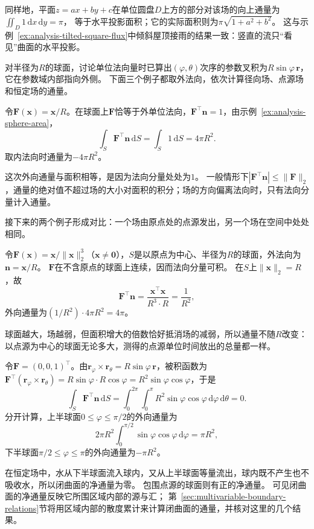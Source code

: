 同样地，平面$z=ax+by+c$在单位圆盘$D$上方的部分对该场的向上通量为$\iint_D1\,\mathrm dx\,\mathrm dy=\pi$，
等于水平投影面积；它的实际面积则为$\pi\sqrt{1+a^2+b^2}$。
这与示例~\ref{ex:analysis-tilted-square-flux}中倾斜屋顶接雨的结果一致：竖直的流只“看见”曲面的水平投影。

对半径为$R$的球面，讨论单位法向量时已算出$(\varphi,\theta)$次序的参数叉积为$R\sin\varphi\,\bm r$，它在参数域内部指向外侧。
下面三个例子都取外法向，依次计算径向场、点源场和恒定场的通量。

\begin{example}[径向场穿过球面]
\label{ex:analysis-radial-field-sphere-flux}
令$\bm F(\bm x)=\bm x/R$。在球面上$\bm F$恰等于外单位法向，$\bm F^\top\bm n=1$，由示例~\ref{ex:analysis-sphere-area}，
\[
 \int_S\bm F^\top\bm n\,\mathrm dS
 =\int_S1\,\mathrm dS=4\pi R^2.
\]
取内法向时通量为$-4\pi R^2$。
\end{example}

这次外向通量与面积相等，是因为法向分量处处为$1$。
一般情形下$|\bm F^\top\bm n|\leq\lVert\bm F\rVert_2$，通量的绝对值不超过场的大小对面积的积分；场的方向偏离法向时，只有法向分量计入通量。

接下来的两个例子形成对比：一个场由原点处的点源发出，另一个场在空间中处处相同。

\begin{example}[点源场的通量与半径无关]
\label{ex:analysis-point-source-sphere-flux}
令$\bm F(\bm x)=\bm x/\lVert\bm x\rVert_2^3$（$\bm x\neq\bm0$），$S$是以原点为中心、半径为$R$的球面，外法向为$\bm n=\bm x/R$。
$\bm F$在不含原点的球面上连续，因而法向分量可积。
在$S$上$\lVert\bm x\rVert_2=R$，故
\[
 \bm F^\top\bm n=\frac{\bm x^\top\bm x}{R^3\cdot R}=\frac1{R^2},
\]
外向通量为$(1/R^2)\cdot4\pi R^2=4\pi$。
\end{example}

球面越大，场越弱，但面积增大的倍数恰好抵消场的减弱，所以通量不随$R$改变：
以点源为中心的球面无论多大，测得的点源单位时间放出的总量都一样。

\begin{example}[恒定场穿过球面的净通量为零]
\label{ex:analysis-constant-field-sphere-flux}
令$\bm F=(0,0,1)^\top$。由$\bm r_\varphi\times\bm r_\theta=R\sin\varphi\,\bm r$，被积函数为
$\bm F^\top(\bm r_\varphi\times\bm r_\theta)=R\sin\varphi\cdot R\cos\varphi=R^2\sin\varphi\cos\varphi$，于是
\[
 \int_S\bm F^\top\bm n\,\mathrm dS
 =\int_0^{2\pi}\int_0^\pi R^2\sin\varphi\cos\varphi\,\mathrm d\varphi\,\mathrm d\theta=0.
\]
分开计算，上半球面$0\leq\varphi\leq\pi/2$的外向通量为
\[
 2\pi R^2\int_0^{\pi/2}\sin\varphi\cos\varphi\,\mathrm d\varphi=\pi R^2,
\]
下半球面$\pi/2\leq\varphi\leq\pi$的外向通量为$-\pi R^2$。
\end{example}

在恒定场中，水从下半球面流入球内，又从上半球面等量流出，球内既不产生也不吸收水，所以闭曲面的净通量为零。
包围点源的球面则有正的净通量。
可见闭曲面的净通量反映它所围区域内部的源与汇；
第~\ref{sec:multivariable-boundary-relations}节将用区域内部的散度累计来计算闭曲面的通量，并核对这里的几个结果。

\FloatBarrier
